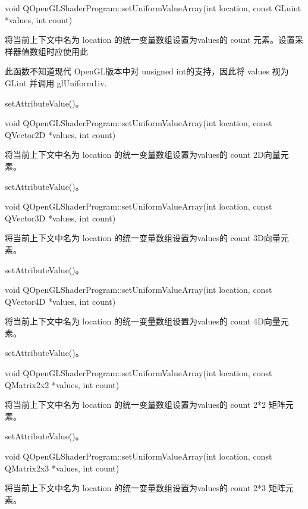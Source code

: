 void QOpenGLShaderProgram::setUniformValueArray(int location, const GLuint *values, int count)

将当前上下文中名为 location 的统一变量数组设置为values的 count 元素。设置采样器值数组时应使用此

\begin{notice}
此函数不知道现代 OpenGL版本中对 unsigned int的支持，因此将 values 视为 GLint 并调用 glUniform1iv.
\end{notice}

\begin{seeAlso}
setAttributeValue()。
\end{seeAlso}

void QOpenGLShaderProgram::setUniformValueArray(int location, const QVector2D *values, int count)

将当前上下文中名为 location 的统一变量数组设置为values的 count 2D向量元素。


\begin{seeAlso}
setAttributeValue()。
\end{seeAlso}

void QOpenGLShaderProgram::setUniformValueArray(int location, const QVector3D *values, int count)

将当前上下文中名为 location 的统一变量数组设置为values的 count 3D向量元素。

\begin{seeAlso}
setAttributeValue()。
\end{seeAlso}

void QOpenGLShaderProgram::setUniformValueArray(int location, const QVector4D *values, int count)

将当前上下文中名为 location 的统一变量数组设置为values的 count 4D向量元素。

\begin{seeAlso}
setAttributeValue()。
\end{seeAlso}

void QOpenGLShaderProgram::setUniformValueArray(int location, const QMatrix2x2 *values, int count)

将当前上下文中名为 location 的统一变量数组设置为values的 count 2*2 矩阵元素。

\begin{seeAlso}
setAttributeValue()。
\end{seeAlso}

void QOpenGLShaderProgram::setUniformValueArray(int location, const QMatrix2x3 *values, int count)

将当前上下文中名为 location 的统一变量数组设置为values的 count 2*3 矩阵元素。

